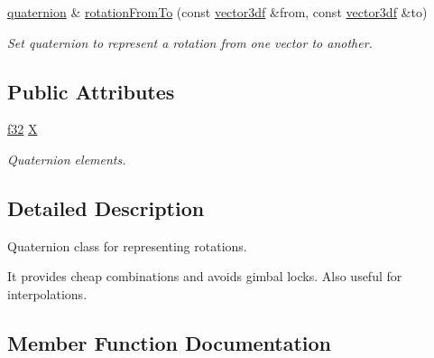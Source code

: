 \begin{DoxyCompactItemize}
\mbox{\label{classirr_1_1core_1_1quaternion_a318c7db064fd6aa6d78d6a82ca26a001}} 
\hyperlink{classirr_1_1core_1_1quaternion}{quaternion} \& \hyperlink{classirr_1_1core_1_1quaternion_a318c7db064fd6aa6d78d6a82ca26a001}{rotation\+From\+To} (const \hyperlink{namespaceirr_1_1core_ae6e2b2a6c552833ebbd5b7463d03586b}{vector3df} \&from, const \hyperlink{namespaceirr_1_1core_ae6e2b2a6c552833ebbd5b7463d03586b}{vector3df} \&to)
\begin{DoxyCompactList}\small\item\em Set quaternion to represent a rotation from one vector to another. \end{DoxyCompactList}\end{DoxyCompactItemize}
\subsection*{Public Attributes}
\begin{DoxyCompactItemize}
\item 
\mbox{\label{classirr_1_1core_1_1quaternion_a69f2ee15363f0b9baa0b3cbb70091342}} 
\hyperlink{namespaceirr_a0277be98d67dc26ff93b1a6a1d086b07}{f32} \hyperlink{classirr_1_1core_1_1quaternion_a69f2ee15363f0b9baa0b3cbb70091342}{X}
\begin{DoxyCompactList}\small\item\em Quaternion elements. \end{DoxyCompactList}\end{DoxyCompactItemize}


\subsection{Detailed Description}
Quaternion class for representing rotations. 

It provides cheap combinations and avoids gimbal locks. Also useful for interpolations. 

\subsection{Member Function Documentation}
\mbox{\label{classirr_1_1core_1_1quaternion_ab4f5eb86ef7a42a3021b810486faa8c8}} 
